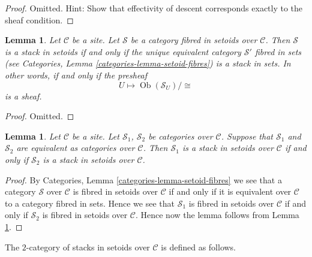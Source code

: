 \documentclass{stacks-project}
\theoremstyle{plain}
\newtheorem{lemma}[subsection]{Lemma}
\theoremstyle{definition}
\theoremstyle{remark}
\numberwithin{equation}{subsection}
\def\Ob{\mathop{\mathrm{Ob}}\nolimits}
\begin{document}
\begin{proof}
Omitted. Hint: Show that effectivity of descent corresponds exactly to
the sheaf condition.
\end{proof}

\begin{lemma}
\label{lemma-stack-in-setoids-characterize}
Let $\mathcal{C}$ be a site.
Let $\mathcal{S}$ be a category fibred in setoids over $\mathcal{C}$.
Then $\mathcal{S}$ is a stack in setoids if and only if the unique
equivalent category $\mathcal{S}'$ fibred in sets (see
Categories, Lemma \ref{categories-lemma-setoid-fibres})
is a stack in sets. In other words, if and only if the presheaf
$$
U \longmapsto \Ob(\mathcal{S}_U)/\!\!\cong
$$
is a sheaf.
\end{lemma}

\begin{proof}
Omitted.
\end{proof}

\begin{lemma}
\label{lemma-stack-in-setoids-equivalent}
Let $\mathcal{C}$ be a site.
Let $\mathcal{S}_1$, $\mathcal{S}_2$ be categories over $\mathcal{C}$.
Suppose that $\mathcal{S}_1$ and $\mathcal{S}_2$ are equivalent
as categories over $\mathcal{C}$.
Then $\mathcal{S}_1$ is a stack in setoids over $\mathcal{C}$ if and only if
$\mathcal{S}_2$ is a stack in setoids over $\mathcal{C}$.
\end{lemma}

\begin{proof}
By
Categories, Lemma \ref{categories-lemma-setoid-fibres}
we see that a category $\mathcal{S}$ over $\mathcal{C}$ is fibred in setoids
over $\mathcal{C}$ if and only if it is equivalent over $\mathcal{C}$
to a category fibred in sets.
Hence we see that $\mathcal{S}_1$ is fibred in setoids over $\mathcal{C}$
if and only if $\mathcal{S}_2$ is fibred in setoids over $\mathcal{C}$.
Hence now the lemma follows from
Lemma \ref{lemma-stack-in-setoids-characterize}.
\end{proof}

\noindent
The $2$-category of stacks in setoids over $\mathcal{C}$
is defined as follows.
\end{document}
